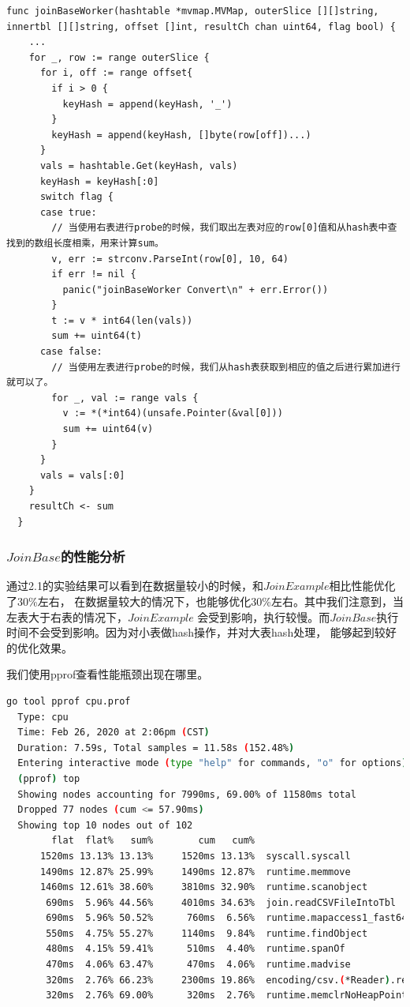 \documentclass[UTF8]{ctexart}
\begin{document}
\begin{lstlisting}[language={Golang}]
  func joinBaseWorker(hashtable *mvmap.MVMap, outerSlice [][]string, innertbl [][]string, offset []int, resultCh chan uint64, flag bool) {
    ...
    for _, row := range outerSlice {
      for i, off := range offset{
        if i > 0 {
          keyHash = append(keyHash, '_')
        }
        keyHash = append(keyHash, []byte(row[off])...)
      }
      vals = hashtable.Get(keyHash, vals)
      keyHash = keyHash[:0]
      switch flag {
      case true:
        // 当使用右表进行probe的时候，我们取出左表对应的row[0]值和从hash表中查找到的数组长度相乘，用来计算sum。
        v, err := strconv.ParseInt(row[0], 10, 64)
        if err != nil {
          panic("joinBaseWorker Convert\n" + err.Error())
        }
        t := v * int64(len(vals))
        sum += uint64(t)
      case false:
        // 当使用左表进行probe的时候，我们从hash表获取到相应的值之后进行累加进行就可以了。
        for _, val := range vals {
          v := *(*int64)(unsafe.Pointer(&val[0]))
          sum += uint64(v)
        }
      }
      vals = vals[:0]
    }
    resultCh <- sum
  }
\end{lstlisting}

\subsubsection{$JoinBase$的性能分析}
通过2.1的实验结果可以看到在数据量较小的时候，和$JoinExample$相比性能优化了30\%左右，
在数据量较大的情况下，也能够优化30\%左右。其中我们注意到，当左表大于右表的情况下，$JoinExample$
会受到影响，执行较慢。而$JoinBase$执行时间不会受到影响。因为对小表做hash操作，并对大表hash处理，
能够起到较好的优化效果。

我们使用pprof查看性能瓶颈出现在哪里。

\begin{lstlisting}[language={bash}]
  go tool pprof cpu.prof                                                                                                      ─╯
  Type: cpu
  Time: Feb 26, 2020 at 2:06pm (CST)
  Duration: 7.59s, Total samples = 11.58s (152.48%)
  Entering interactive mode (type "help" for commands, "o" for options)
  (pprof) top
  Showing nodes accounting for 7990ms, 69.00% of 11580ms total
  Dropped 77 nodes (cum <= 57.90ms)
  Showing top 10 nodes out of 102
        flat  flat%   sum%        cum   cum%
      1520ms 13.13% 13.13%     1520ms 13.13%  syscall.syscall
      1490ms 12.87% 25.99%     1490ms 12.87%  runtime.memmove
      1460ms 12.61% 38.60%     3810ms 32.90%  runtime.scanobject
       690ms  5.96% 44.56%     4010ms 34.63%  join.readCSVFileIntoTbl
       690ms  5.96% 50.52%      760ms  6.56%  runtime.mapaccess1_fast64
       550ms  4.75% 55.27%     1140ms  9.84%  runtime.findObject
       480ms  4.15% 59.41%      510ms  4.40%  runtime.spanOf
       470ms  4.06% 63.47%      470ms  4.06%  runtime.madvise
       320ms  2.76% 66.23%     2300ms 19.86%  encoding/csv.(*Reader).readRecord
       320ms  2.76% 69.00%      320ms  2.76%  runtime.memclrNoHeapPointers
\end{lstlisting}
\end{document}
